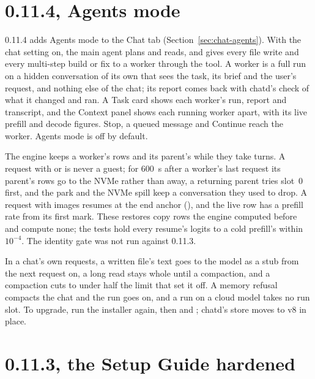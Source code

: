 \section{0.11.4, Agents mode}\label{sec:changelog-0114}

0.11.4 adds Agents mode to the Chat tab (Section~\ref{sec:chat-agents}). With the chat setting  on, the main agent plans and reads, and gives every file write and every multi-step build or fix to a worker through the  tool. A worker is a full run on a hidden conversation of its own that sees the task, its brief and the user's request, and nothing else of the chat; its report comes back with chatd's check of what it changed and ran. A Task card shows each worker's run, report and transcript, and the Context panel shows each running worker apart, with its live prefill and decode figures. Stop, a queued message and Continue reach the worker. Agents mode is off by default.

The engine keeps a worker's rows and its parent's while they take turns. A request with  or  is never a guest; for 600~s after a worker's last request its parent's rows go to the NVMe rather than away, a returning parent tries slot~0 first, and the park and the NVMe spill keep a conversation they used to drop. A request with images resumes at the end anchor (), and the live row has a prefill rate from its first mark. These restores copy rows the engine computed before and compute none; the tests hold every resume's logits to a cold prefill's within $10^{-4}$. The identity gate was not run against 0.11.3.

In a chat's own requests, a written file's text goes to the model as a stub from the next request on, a long read stays whole until a compaction, and a compaction cuts to under half the limit that set it off. A memory refusal compacts the chat and the run goes on, and a run on a cloud model takes no run slot. To upgrade, run the installer again, then  and ; chatd's store moves to v8 in place.

\section{0.11.3, the Setup Guide hardened}\label{sec:changelog-0113}

